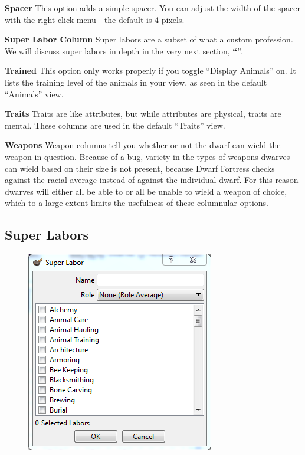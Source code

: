 \documentclass[]{article}
\newcommand{\jump}[1] {\textbf{``\nameref{sec:#1}}''}
\newcommand{\boldlist}[1] {
\vspace{12pt}
\noindent \textbf{#1}
}
\begin{document}
\boldlist{Spacer} This option adds a simple spacer. You can adjust the width of the spacer with the right
click menu---the default is 4 pixels.

\boldlist{Super Labor Column} Super labors are a subset of what a custom profession. We will discuss
super labors in depth in the very next section, \jump{Super Labors}.

\boldlist{Trained} This option only works properly if you toggle ``Display Animals'' on. It lists the
training level of the animals in your view, as seen in the default ``Animals'' view.

\boldlist{Traits} Traits are like attributes, but while attributes are physical, traits are mental. These
columns are used in the default ``Traits'' view.

\boldlist{Weapons} Weapon columns tell you whether or not the dwarf can wield the weapon in question.
Because of a bug, variety in the types of weapons dwarves can wield based on their size is not present,
because Dwarf Fortress checks against the racial average instead of against the individual dwarf. For
this reason dwarves will either all be able to or all be unable to wield a weapon of choice, which
to a large extent limits the usefulness of these columnular options.

\subsection{Super Labors}
\label{sec:Super Labors}

\begin{figure}
\vspace{-20pt}
  \begin{center}
    \includegraphics[width=\linewidth]{Sec4Fig18}
  \end{center}
\end{figure}
\end{document}
